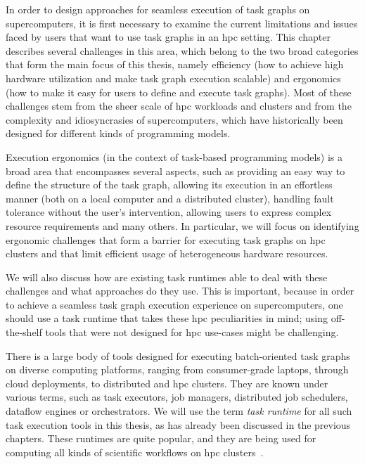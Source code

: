 In order to design approaches for seamless execution of task graphs on supercomputers, it is first
necessary to examine the current limitations and issues faced by users that want to use task graphs
in an \gls{hpc} setting. This chapter describes several challenges in this area, which
belong to the two broad categories that form the main focus of this thesis, namely efficiency (how
to achieve high hardware utilization and make task graph execution scalable) and ergonomics (how to
make it easy for users to define and execute task graphs). Most of these challenges stem from the
sheer scale of \gls{hpc} workloads and clusters and from the complexity and
idiosyncrasies of supercomputers, which have historically been designed for different kinds of
programming models.

Execution ergonomics (in the context of task-based programming models) is a broad area that
encompasses several aspects, such as providing an easy way to define the structure of the task
graph, allowing its execution in an effortless manner (both on a local computer and a distributed
cluster), handling fault tolerance without the user's intervention, allowing users to express
complex resource requirements and many others. In particular, we will focus on identifying
ergonomic challenges that form a barrier for executing task graphs on \gls{hpc}
clusters and that limit efficient usage of heterogeneous hardware resources.

We will also discuss how are existing task runtimes able to deal with these challenges and what
approaches do they use. This is important, because in order to achieve a seamless task graph
execution experience on supercomputers, one should use a task runtime that takes these
\gls{hpc} peculiarities in mind; using off-the-shelf tools that were not designed for
\gls{hpc} use-cases might be challenging.

There is a large body of tools designed for executing batch-oriented task graphs on diverse
computing platforms, ranging from consumer-grade laptops, through cloud deployments, to distributed
and \gls{hpc} clusters. They are known under various terms, such as task executors,
job managers, distributed job schedulers, dataflow engines or orchestrators. We will use the term
\emph{task runtime} for all such task execution tools in this thesis, as has already been
discussed in the previous chapters. These runtimes are quite popular, and they are being used for
computing all kinds of scientific workflows on \gls{hpc}
clusters~\cite{hpc_tasks, hpc_tasks_2, hpc_tasks_3, pegasus}.

